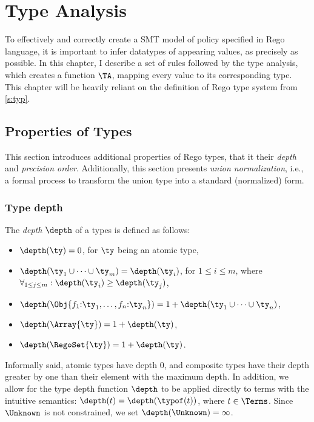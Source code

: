 \chapter{Type Analysis}
\label{ch:typ}

%
To effectively and correctly create a SMT model of policy specified in Rego language, it is important to infer datatypes of appearing values, as precisely as possible.
In this chapter, I describe a set of rules followed by the type analysis, which creates a function $\TA$, mapping every value to its corresponding type.
This chapter will be heavily reliant on the definition of Rego type system from \ref{s:typ}.

\section{Properties of Types}

This section introduces additional properties of Rego types, that it their \emph{depth} and \emph{precision order}.
Additionally, this section presents \emph{union normalization}, i.e., a formal process to transform the union type into a standard (normalized) form.

\subsection{Type depth}

The \emph{depth} $\depth$ of a types is defined as follows:
\begin{itemize}
  \item $\depth(\ty) = 0$, for $\ty$ being an atomic type,
  \item $\depth(\ty_1 \cup \cdots \cup \ty_m) = \depth(\ty_i)$, for $1 \leq i \leq m$, where $\forall_{1 \leq j \leq m}:\depth(\ty_i) \geq \depth(\ty_j)$,
  \item $\depth(\Obj{f_1{:}\ty_1,\ldots,f_n{:}\ty_n}) = 1+\depth(\ty_1 \cup \cdots \cup \ty_n)$,
  \item $\depth(\Array{\ty}) = 1+\depth(\ty)$,
  \item $\depth(\RegoSet{\ty}) = 1+\depth(\ty)$.
\end{itemize}

Informally said, atomic types have depth $0$, and composite types have their depth greater by one than their element with the maximum depth.
In addition, we allow for the type depth function $\depth$ to be applied directly to terms with the intuitive semantics: $\depth(t) = \depth(\typof(t))$, where $t \in \Terms$.
Since $\Unknown$ is not constrained, we set $\depth(\Unknown) = \infty$.

